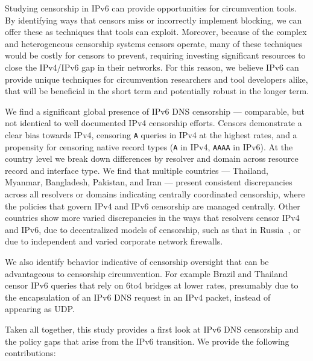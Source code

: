 Studying censorship in IPv6 can provide opportunities for circumvention tools.
By identifying ways that censors miss or incorrectly implement blocking, we can
offer these as techniques that tools can exploit. Moreover, because of the
complex and heterogeneous censorship systems censors operate, many of these
techniques would be costly for censors to prevent, requiring investing
significant resources to close the IPv4/IPv6 gap in their networks. For this
reason, we believe IPv6 can provide unique techniques for circumvention
researchers and tool developers alike, that will be beneficial in the short term and
potentially robust in the longer term.

\medskip
We find a significant global presence of IPv6 DNS censorship --- comparable, but not
identical to well documented IPv4 censorship efforts. Censors demonstrate a
clear bias towards IPv4, censoring \texttt{A} queries in IPv4 at the highest rates,
and a propensity for censoring native record types (\texttt{A} in IPv4, \texttt{AAAA} in IPv6).
At the country level we break down differences by resolver and
domain across resource record and interface type. We find that multiple countries
--- Thailand, Myanmar, Bangladesh, Pakistan, and Iran ---
present consistent discrepancies across all resolvers or domains indicating
centrally coordinated censorship, where the policies that govern IPv4 and IPv6
censorship are managed centrally.
Other countries show more varied discrepancies in the
ways that resolvers censor IPv4 and IPv6, due to decentralized models of
censorship, such as that in Russia~\cite{ramesh2020decentralized}, or due to
independent and varied corporate network firewalls.

We also identify behavior indicative of censorship oversight that can be advantageous
to censorship circumvention. For example Brazil and Thailand censor IPv6
queries that rely on 6to4 bridges at lower rates, presumably due to the encapsulation of an
IPv6 DNS request in an IPv4 packet, instead of appearing as UDP.

Taken all together, this study provides a first look at IPv6 DNS censorship and
the policy gaps that arise from the IPv6 transition. We provide the following
contributions:

